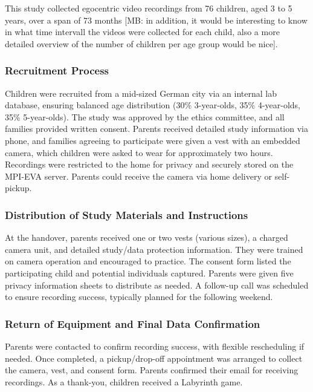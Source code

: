 \documentclass[
  man,floatsintext]{apa6}
\begin{document}
This study collected egocentric video recordings from 76 children, aged 3 to 5 years, over a span of 73 months {[}MB: in addition, it would be interesting to know in what time intervall the videos were collected for each child, also a more detailed overview of the number of children per age group would be nice{]}.

\subsubsection{Recruitment Process}\label{recruitment-process}

Children were recruited from a mid-sized German city via an internal lab database, ensuring balanced age distribution (30\% 3-year-olds, 35\% 4-year-olds, 35\% 5-year-olds). The study was approved by the ethics committee, and all families provided written consent. Parents received detailed study information via phone, and families agreeing to participate were given a vest with an embedded camera, which children were asked to wear for approximately two hours. Recordings were restricted to the home for privacy and securely stored on the MPI-EVA server. Parents could receive the camera via home delivery or self-pickup.

\subsubsection{Distribution of Study Materials and Instructions}\label{distribution-of-study-materials-and-instructions}

At the handover, parents received one or two vests (various sizes), a charged camera unit, and detailed study/data protection information. They were trained on camera operation and encouraged to practice. The consent form listed the participating child and potential individuals captured. Parents were given five privacy information sheets to distribute as needed. A follow-up call was scheduled to ensure recording success, typically planned for the following weekend.

\subsubsection{Return of Equipment and Final Data Confirmation}\label{return-of-equipment-and-final-data-confirmation}

Parents were contacted to confirm recording success, with flexible rescheduling if needed. Once completed, a pickup/drop-off appointment was arranged to collect the camera, vest, and consent form. Parents confirmed their email for receiving recordings. As a thank-you, children received a Labyrinth game.
\end{document}
